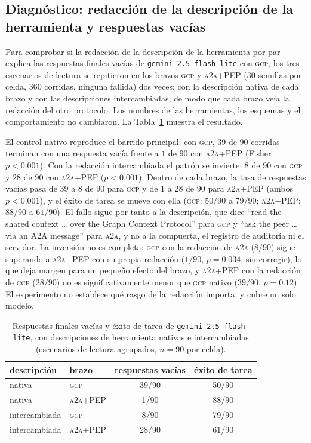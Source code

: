 \documentclass[conference,letterpaper]{IEEEtran}
\newcommand{\gcp}{\textsc{gcp}}
\newcommand{\ata}{\textsc{a2a}}
\begin{document}
\subsection{Diagnóstico: redacción de la descripción de la herramienta y respuestas vacías}
\label{sec:swap}
Para comprobar si la redacción de la descripción de la herramienta por par explica las respuestas
finales vacías de \texttt{gemini-2.5-flash-lite} con \gcp{}, los tres escenarios de lectura se
repitieron en los brazos \gcp{} y \ata{}+PEP ($30$ semillas por celda, $360$ corridas, ninguna fallida)
dos veces: con la descripción nativa de cada brazo y con las descripciones intercambiadas, de modo que
cada brazo veía la redacción del otro protocolo. Los nombres de las herramientas, los esquemas y el
comportamiento no cambiaron. La Tabla~\ref{tab:swap} muestra el resultado.

El control nativo reproduce el barrido principal: con \gcp{}, $39$ de $90$ corridas terminan con una
respuesta vacía frente a $1$ de $90$ con \ata{}+PEP (Fisher $p<0.001$). Con la redacción intercambiada
el patrón se invierte: $8$ de $90$ con \gcp{} y $28$ de $90$ con \ata{}+PEP ($p<0.001$). Dentro de cada
brazo, la tasa de respuestas vacías pasa de $39$ a $8$ de $90$ para \gcp{} y de $1$ a $28$ de $90$ para
\ata{}+PEP (ambos $p<0.001$), y el éxito de tarea se mueve con ella (\gcp{}: $50/90$ a $79/90$;
\ata{}+PEP: $88/90$ a $61/90$). El fallo sigue por tanto a la descripción, que dice ``read the shared
context \dots{} over the Graph Context Protocol'' para \gcp{} y ``ask the peer \dots{} via an A2A
message'' para \ata{}, y no a la compuerta, el registro de auditoría ni el servidor. La inversión no es
completa: \gcp{} con la redacción de \ata{} ($8/90$) sigue superando a \ata{}+PEP con su propia redacción
($1/90$, $p=0.034$, sin corregir), lo que deja margen para un pequeño efecto del brazo, y \ata{}+PEP con
la redacción de \gcp{} ($28/90$) no es significativamente menor que \gcp{} nativo ($39/90$, $p=0.12$).
El experimento no establece qué rasgo de la redacción importa, y cubre un solo modelo.

\begin{table}[H]
\centering
\caption{Respuestas finales vacías y éxito de tarea de \texttt{gemini-2.5-flash-lite}, con
descripciones de herramienta nativas e intercambiadas (escenarios de lectura agrupados, $n=90$ por
celda).}
\label{tab:swap}
\setlength{\tabcolsep}{5pt}
\begin{tabular}{llcc}
\toprule
descripción & brazo & respuestas vacías & éxito de tarea \\
\midrule
nativa        & \gcp{}     & 39/90 & 50/90 \\
nativa        & \ata{}+PEP & 1/90  & 88/90 \\
intercambiada & \gcp{}     & 8/90  & 79/90 \\
intercambiada & \ata{}+PEP & 28/90 & 61/90 \\
\bottomrule
\end{tabular}
\end{table}
\end{document}
